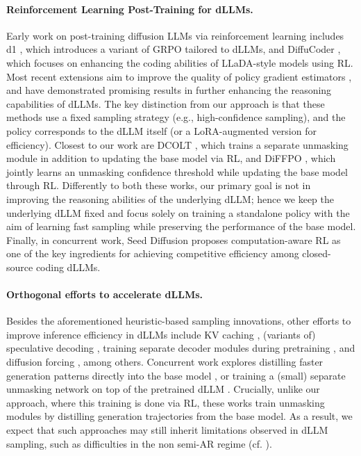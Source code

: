 \paragraph{Reinforcement Learning Post-Training for dLLMs.} Early work on post-training diffusion LLMs via reinforcement learning includes d1 \citep{zhao2025d1}, which introduces a variant of GRPO tailored to dLLMs, and DiffuCoder \citep{gong2025diffucoder}, which focuses on enhancing the coding abilities of LLaDA-style models using RL. Most recent extensions aim to improve the quality of policy gradient estimators \citep{tang2025wd1, wang2025spg, lin2025boundary, rojas2025improving, zhu2025enhancing, wang2025revolutionizing, zhan2025principled}, and have demonstrated promising results in further enhancing the reasoning capabilities of dLLMs. The key distinction from our approach is that these methods use a fixed sampling strategy (e.g., high-confidence sampling), and the policy corresponds to the dLLM itself (or a LoRA-augmented version for efficiency). Closest to our work are DCOLT \citep{huang2025reinforcing}, which trains a separate unmasking module in addition to updating the base model via RL, and DiFFPO \citep{zhao2025diffpo}, which jointly learns an unmasking confidence threshold while updating the base model through RL. 
Differently to both these works, our primary goal is not in improving the reasoning abilities of the underlying dLLM; hence we keep the underlying dLLM fixed and focus solely on training a standalone policy with the aim of learning fast sampling while preserving the performance of the base model.
Finally, in concurrent work, Seed Diffusion \citep{song2025seed} proposes computation-aware RL as one of the key ingredients for achieving competitive efficiency among closed-source coding dLLMs.

\paragraph{Orthogonal efforts to accelerate dLLMs.} Besides the aforementioned heuristic-based sampling innovations, other efforts to improve inference efficiency in dLLMs \citep{ma2025dinfer} include KV caching \citep{jiang2025d, fastdllm2025}, (variants of) speculative decoding \citep{israel2025accelerating, campbell2025self, guo2025reviving}, training separate decoder modules during pretraining \citep{liu2024think, arriola2025encoder}, and diffusion forcing \citep{wang2025diffusion}, among others. Concurrent work explores distilling faster generation patterns directly into the base model \citep{chen2025dparallel}, or training a (small) separate unmasking network on top of the pretrained dLLM \citep{bansal2025enabling, bao2025learning}. Crucially, unlike our approach, where this training is done via RL, these works train unmasking modules by distilling generation trajectories from the base model. As a result, we expect that such approaches may still inherit limitations observed in dLLM sampling, such as difficulties in the non semi-AR regime (cf. ).

